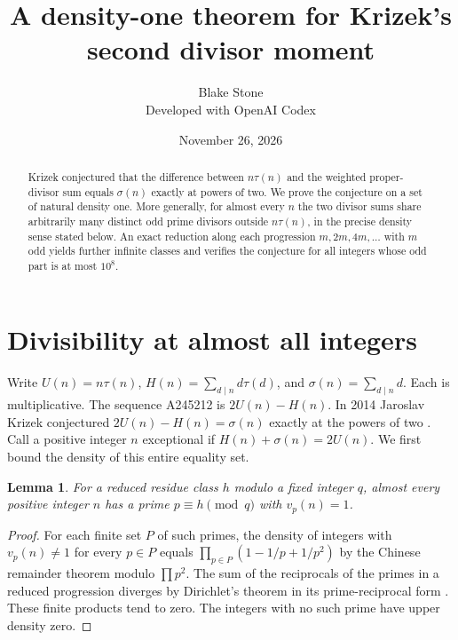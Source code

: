 \documentclass[11pt]{article}
\title{A density-one theorem for Krizek's second divisor moment}
\author{Blake Stone\\\small Developed with OpenAI Codex}
\date{November 26, 2026}
\newtheorem{lemma}[theorem]{Lemma}
\begin{document}
\maketitle
\begin{abstract}
Krizek conjectured that the difference between $n\tau(n)$ and the
weighted proper-divisor sum equals $\sigma(n)$ exactly at powers of
two. We prove the conjecture on a set of natural density one.
More generally, for almost every $n$ the two divisor sums share
arbitrarily many distinct odd prime divisors outside $n\tau(n)$,
in the precise density sense stated below. An exact reduction along
each progression $m,2m,4m,\ldots$ with $m$ odd yields further
infinite classes and verifies the conjecture for all integers whose
odd part is at most $10^8$.
\end{abstract}

\section{Divisibility at almost all integers}
Write $U(n)=n\tau(n)$, $H(n)=\sum_{d\mid n}d\tau(d)$, and
$\sigma(n)=\sum_{d\mid n}d$. Each is multiplicative. The sequence
A245212 is $2U(n)-H(n)$. In 2014 Jaroslav Krizek conjectured
$2U(n)-H(n)=\sigma(n)$ exactly at the powers of two \cite{oeis}.
Call a positive integer $n$ exceptional if $H(n)+\sigma(n)=2U(n)$.
We first bound the density of this entire equality set.

\begin{lemma}
For a reduced residue class $h$ modulo a fixed integer $q$, almost
every positive integer $n$ has a prime $p\equiv h\pmod q$ with
$v_p(n)=1$.
\end{lemma}
\begin{proof}
For each finite set $P$ of such primes, the density of integers with
$v_p(n)\ne1$ for every $p\in P$ equals
$\prod_{p\in P}(1-1/p+1/p^2)$ by the Chinese remainder theorem
modulo $\prod p^2$. The sum of the reciprocals of the primes in a
reduced progression diverges by Dirichlet's theorem in its
prime-reciprocal form \cite{dirichlet}. These finite products tend
to zero. The integers with no such prime have upper density zero.
\end{proof}
\end{document}
